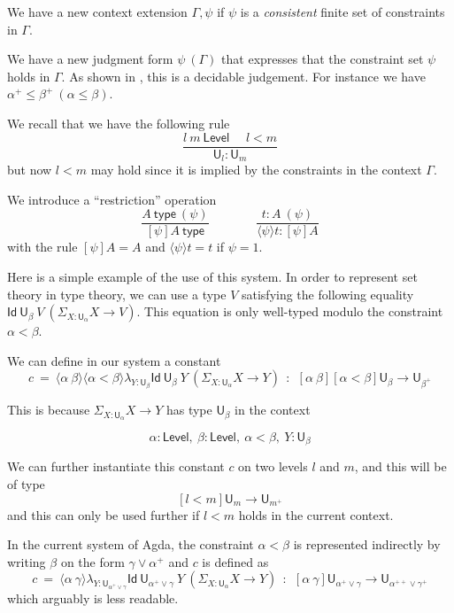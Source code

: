 \documentclass[11pt,a4paper]{article}
\theoremstyle{definition}
\newcommand{\lam}[1]{{\langle}#1{\rangle}}
\newcommand{\Id}{\mathsf{Id}}
\newcommand{\UU}{\mathsf{U}}
\newcommand{\Level}{\mathsf{Level}}
\newcommand{\type}{\mathsf{type}}
\begin{document}
We  have a new context extension $\Gamma,\psi$ if $\psi$ is a {\em consistent}
finite set of constraints in $\Gamma$.

We have a new judgment form $\psi~(\Gamma)$ that expresses that the constraint set $\psi$
holds in $\Gamma$.
As shown in \cite{bezem-coquand:lattices}, this is a decidable judgement.
For instance we have $\alpha^+\leqslant\beta^+~(\alpha\leqslant\beta)$.

We recall that we have the following rule
$$
\frac{l~m~\Level~~~~~~l<m}{\UU_l:\UU_m}
$$
but now $l<m$ may hold since it is implied by the constraints in the context $\Gamma$.

We introduce a ``restriction'' operation
$$
\frac{A~\type~(\psi)}{[\psi]A~\type}~~~~~~~~~~~~~~~~~
\frac{{t}:A~(\psi)}{\lam{\psi}{t}:[\psi]A}
$$
with the rule $[\psi]A = A$ and $\lam{\psi}{t} = t$ if $\psi = 1$.

\medskip

Here is a simple example of the use of this system. In order to represent set theory in type
theory, we can use a type $V$ satisfying the following equality $\Id~{\UU_{\beta}}~V~(\Sigma_{X:\UU_{\alpha}}X\rightarrow V)$.
This equation is only well-typed modulo the constraint $\alpha<\beta$.

We can define in our system a constant
$$
c~=~\lam{\alpha~\beta}\lam{\alpha<\beta}\lambda_{Y:\UU_{\beta}}\Id~{\UU_{\beta}}~Y~ (\Sigma_{X:\UU_{\alpha}}X\rightarrow Y)~~:~~
   [\alpha~\beta][\alpha<\beta]\UU_{\beta} \rightarrow \UU_{\beta^+}
$$

   This is because $\Sigma_{X:\UU_{\alpha}}X\rightarrow Y$ has type $\UU_{\beta}$ in the context

   $$\alpha:\Level,~\beta:\Level,~\alpha<\beta,~Y:\UU_{\beta}$$

   We can further instantiate this constant $c$ on two levels $l$ and $m$, and this will be of type
   $$[l<m]\UU_{m} \rightarrow \UU_{m^+}$$
   and this can only be used further if $l<m$ holds in the current context.

   \medskip


In the current system of Agda, the constraint $\alpha<\beta$ is represented indirectly by
writing $\beta$ on the form $\gamma\vee \alpha^+$ and $c$ is defined as
$$
c~=~\lam{\alpha~\gamma}\lambda_{Y:\UU_{\alpha^+\vee\gamma}}\Id~{\UU_{\alpha^+\vee\gamma}}~Y~ (\Sigma_{X:\UU_{\alpha}}X\rightarrow Y)~~:~~
   [\alpha~\gamma]\UU_{\alpha^+\vee\gamma} \rightarrow \UU_{\alpha^{++}\vee\gamma^+}
$$
   which arguably is less readable.
\end{document}
